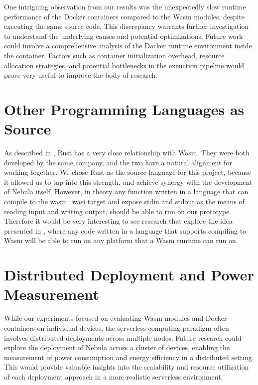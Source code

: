 \documentclass[
  table]{report}
\begin{document}
One intriguing observation from our results was the unexpectedly slow
runtime performance of the Docker containers compared to the \ac{Wasm}
modules, despite executing the same source code. This discrepancy
warrants further investigation to understand the underlying causes and
potential optimizations. Future work could involve a comprehensive
analysis of the Docker runtime environment inside the container. Factors
such as container initialization overhead, resource allocation
strategies, and potential bottlenecks in the exeuction pipeline would
prove very useful to improve the body of research.

\section{Other Programming Languages as Source}

As described in , Rust has a very close
relationship with \ac{Wasm}. They were both developed by the same
company, and the two have a natural alignment for working together. We
chose Rust as the source language for this project, because it allowed
us to tap into this strength, and achieve synergy with the development
of Nebula itself. However, in theory any function written in a language
that can compile to the wasm\_wasi target and expose stdin and stdout as
the means of reading input and writing output, should be able to run on
our prototype. Therefore it would be very interesting to see research
that explore the idea presented in , where any
code written in a language that supports compiling to \ac{Wasm} will be
able to run on any platform that a \ac{Wasm} runtime can run on.

\section{Distributed Deployment and Power Measurement}

While our experiments focused on evaluating Wasm modules and Docker
containers on individual devices, the serverless computing paradigm
often involves distributed deployments across multiple nodes. Future
research could explore the deployment of Nebula across a cluster of
devices, enabling the measurement of power consumption and energy
efficiency in a distributed setting. This would provide valuable
insights into the scalability and resource utilization of each
deployment approach in a more realistic serverless environment.
\end{document}
